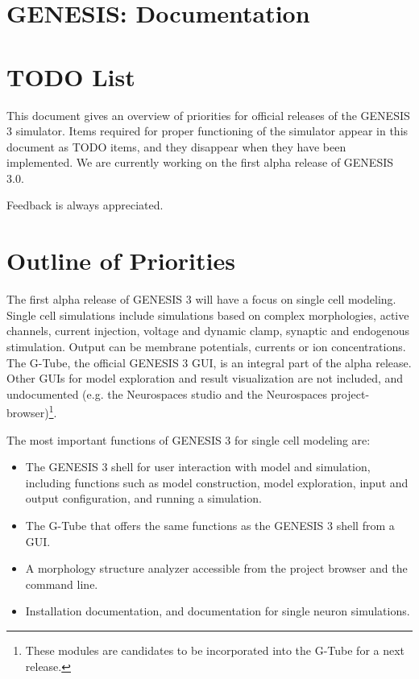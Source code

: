 \documentclass[12pt]{article}
\begin{document}
\section*{GENESIS: Documentation}

\section*{TODO List}

This document gives an overview of priorities for official releases of
the GENESIS 3 simulator.  Items required for proper functioning of the
simulator appear in this document as TODO items, and they disappear
when they have been implemented.  We are currently working on the
first alpha release of GENESIS 3.0.

Feedback is always appreciated.


\section{Outline of Priorities}

The first alpha release of GENESIS 3 will have a focus on single cell
modeling.  Single cell simulations include simulations based on
complex morphologies, active channels, current injection, voltage and
dynamic clamp, synaptic and endogenous stimulation.  Output can be
membrane potentials, currents or ion concentrations.  The G-Tube, the
official GENESIS 3 GUI, is an integral part of the alpha release.
Other GUIs for model exploration and result visualization are not
included, and undocumented (e.g. the Neurospaces studio and the
Neurospaces project-browser)\footnote{These modules are candidates to
  be incorporated into the G-Tube for a next release.}.

The most important functions of GENESIS 3 for single cell modeling
are:

\begin{itemize}
\item The GENESIS 3 shell for user interaction with model and
  simulation, including functions such as model construction, model
  exploration, input and output configuration, and running a
  simulation.
\item The G-Tube that offers the same functions as the GENESIS 3 shell
  from a GUI.
\item A morphology structure analyzer accessible from the project
  browser and the command line.
\item Installation documentation, and documentation for single neuron
  simulations.
\end{itemize}
\end{document}
